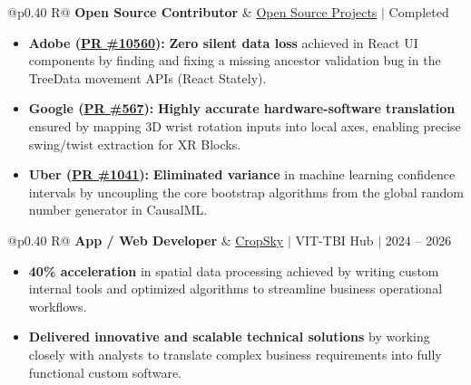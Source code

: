 \documentclass[a4paper,10pt]{article}
\newcommand{\ulink}[2]{\href{#1}{#2}}
\newcommand{\subheading}[1]{{\color[HTML]{0A0A0A}\fontsize{12}{14}\selectfont\bfseries #1}}
\newcommand{\meta}[1]{{\color[HTML]{5C5C5C}\fontsize{10.5}{12.5}\selectfont #1}}
\begin{document}
\begin{tabularx}{\linewidth}{@{}p{0.40\linewidth} R@{}}
\subheading{Open Source Contributor} & \meta{\ulink{https://github.com/su-jin1425/My-Open-Source-Contributions}{Open Source Projects} $|$ Completed}
\end{tabularx}
\begin{itemize}[nosep, leftmargin=1.5em, itemsep=2pt, topsep=2pt]
  \item {\color[HTML]{0A0A0A}\fontsize{11}{14}\selectfont \textbf{Adobe (\ulink{https://github.com/adobe/react-spectrum/pull/10560}{PR \#10560}):} \textbf{Zero silent data loss} achieved in React UI components by finding and fixing a missing ancestor validation bug in the TreeData movement APIs (React Stately).}
  \item {\color[HTML]{0A0A0A}\fontsize{11}{14}\selectfont \textbf{Google (\ulink{https://github.com/google/xrblocks/pull/567}{PR \#567}):} \textbf{Highly accurate hardware-software translation} ensured by mapping 3D wrist rotation inputs into local axes, enabling precise swing/twist extraction for XR Blocks.}
  \item {\color[HTML]{0A0A0A}\fontsize{11}{14}\selectfont \textbf{Uber (\ulink{https://github.com/uber/causalml/pull/1041}{PR \#1041}):} \textbf{Eliminated variance} in machine learning confidence intervals by uncoupling the core bootstrap algorithms from the global random number generator in CausalML.}
\end{itemize}

\begin{tabularx}{\linewidth}{@{}p{0.40\linewidth} R@{}}
\subheading{App / Web Developer} & \meta{\ulink{https://sites.google.com/view/cropsky/home}{CropSky} $|$ VIT-TBI Hub $|$ 2024 -- 2026}
\end{tabularx}
\begin{itemize}[nosep, leftmargin=1.5em, itemsep=2pt, topsep=2pt]
  \item {\color[HTML]{0A0A0A}\fontsize{11}{14}\selectfont \textbf{40\% acceleration} in spatial data processing achieved by writing custom internal tools and optimized algorithms to streamline business operational workflows.}
  \item {\color[HTML]{0A0A0A}\fontsize{11}{14}\selectfont \textbf{Delivered innovative and scalable technical solutions} by working closely with analysts to translate complex business requirements into fully functional custom software.}
\end{itemize}


\end{document}
